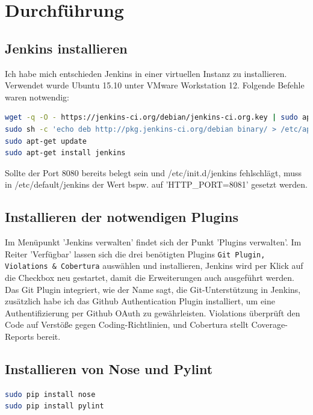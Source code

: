 \documentclass[letterpaper, 12pt]{article}
\let\tempsection\section
\renewcommand\section[1]{\vspace{-0.3cm}\tempsection{#1}\vspace{-0.3cm}}
\let\tempsubsection\subsection
\renewcommand\subsection[1]{\vspace{0cm}\tempsubsection{#1}\vspace{0cm}}
\begin{document}
\section{Durchführung}

\subsection{Jenkins installieren}
Ich habe mich entschieden Jenkins in einer virtuellen Instanz zu installieren. Verwendet wurde Ubuntu 15.10 unter VMware Workstation 12. Folgende Befehle waren notwendig: \\

\begin{lstlisting}[frame=single,language=bash, caption=Jenkins in Ubuntu installieren \cite{jenkins}]
wget -q -O - https://jenkins-ci.org/debian/jenkins-ci.org.key | sudo apt-key add -
sudo sh -c 'echo deb http://pkg.jenkins-ci.org/debian binary/ > /etc/apt/sources.list.d/jenkins.list'
sudo apt-get update
sudo apt-get install jenkins
\end{lstlisting}

Sollte der Port 8080 bereits belegt sein und /etc/init.d/jenkins fehlschlägt, muss in /etc/default/jenkins der Wert bspw. auf 'HTTP\_PORT=8081' gesetzt werden.

\subsection{Installieren der notwendigen Plugins}
Im Menüpunkt 'Jenkins verwalten' findet sich der Punkt 'Plugins verwalten'. Im Reiter 'Verfügbar' lassen sich die drei benötigten Plugins \texttt{Git Plugin, Violations \& Cobertura} auswählen und installieren, Jenkins wird per Klick auf die Checkbox neu gestartet, damit die Erweiterungen auch ausgeführt werden. \\
Das Git Plugin integriert, wie der Name sagt, die Git-Unterstützung in Jenkins, zusätzlich habe ich das Github Authentication Plugin installiert, um eine Authentifizierung per Github OAuth zu gewährleisten. Violations überprüft den Code auf Verstöße gegen Coding-Richtlinien, und Cobertura stellt Coverage-Reports bereit. 

\subsection{Installieren von Nose und Pylint}

\begin{lstlisting}[frame=single,language=bash, caption=Nose und Pylint mit pip installieren]
sudo pip install nose
sudo pip install pylint
\end{lstlisting}
\end{document}
